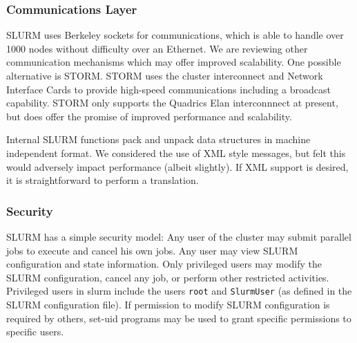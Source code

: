 \subsubsection{Communications Layer}

SLURM uses Berkeley sockets for communications, which is able to handle 
over 1000 nodes without difficulty over an Ethernet. 
We are reviewing other communication 
mechanisms which may offer improved scalability. One possible alternative 
is STORM\cite{STORM2001}. 
STORM uses the cluster interconnect and Network Interface Cards to 
provide high-speed communications including a broadcast capability. 
STORM only supports the Quadrics Elan interconnnect at present, but does 
offer the promise of improved performance and scalability. 

Internal SLURM functions pack and unpack data structures in machine 
independent format. We considered the use of XML style messages, 
but felt this would adversely impact performance (albeit slightly). 
If XML support is desired, it is straightforward to perform a translation.

\subsubsection{Security}

SLURM has a simple security model: 
Any user of the cluster may submit parallel jobs to execute and cancel
his own jobs.  Any user may view SLURM configuration and state
information.  
Only privileged users may modify the SLURM configuration,
cancel any job, or perform other restricted activities.  
Privileged users in slurm include the users {\tt root} 
and {\tt SlurmUser} (as defined in the SLURM configuration file). 
If permission to modify SLURM configuration is 
required by others, set-uid programs may be used to grant specific
permissions to specific users.


